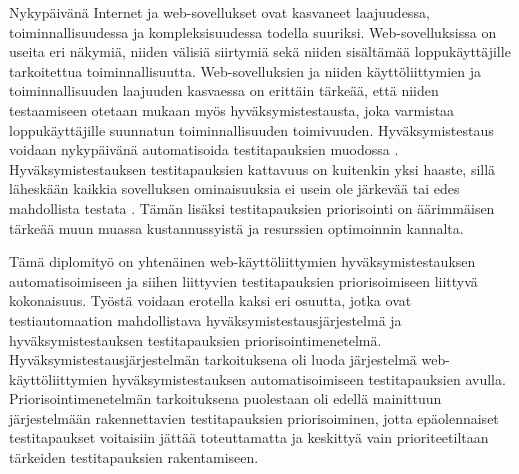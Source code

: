 Nykypäivänä Internet ja web-sovellukset ovat kasvaneet laajuudessa, toiminnallisuudessa ja komp\-lek\-si\-suu\-des\-sa todella suuriksi.
Web-sovelluksissa on useita eri näkymiä, niiden välisiä siirtymiä sekä niiden sisältämää loppukäyttäjille tarkoitettua toiminnallisuutta.
Web-sovelluksien ja niiden käyttöliittymien ja toiminnallisuuden laajuuden kasvaessa on erittäin tärkeää, että niiden testaamiseen otetaan mukaan myös hyväksymistestausta, joka varmistaa loppukäyttäjille suunnatun toiminnallisuuden toimivuuden.
Hyväksymistestaus voidaan nykypäivänä automatisoida testitapauksien muodossa \cite{robot_framework_book}.
Hyväksymistestauksen testitapauksien kattavuus on kuitenkin yksi haaste, sillä läheskään kaikkia sovelluksen ominaisuuksia ei usein ole järkevää tai edes mahdollista testata \cite[s.~24]{software_testing_book}.
Tämän lisäksi testitapauksien priorisointi on äärimmäisen tärkeää muun muassa kustannussyistä ja resurssien optimoinnin kannalta.

Tämä diplomityö on yhtenäinen web-käyttöliittymien hyväksymistestauksen automatisoimiseen ja siihen liittyvien testitapauksien priorisoimiseen liittyvä kokonaisuus.
Työstä voidaan erotella kaksi eri osuutta, jotka ovat testiautomaation mahdollistava hyväksymistestausjärjestelmä ja hyväksymistestauksen testitapauksien priorisointimenetelmä.
Hyväksymistestausjärjestelmän tarkoituksena oli luoda järjestelmä web-käyttöliittymien hyväksymistestauksen automatisoimiseen testitapauksien avulla.
Priorisointimenetelmän tarkoituksena puolestaan oli edellä mainittuun järjestelmään rakennettavien testitapauksien priorisoiminen, jotta epäolennaiset testitapaukset voitaisiin jättää toteuttamatta ja keskittyä vain prioriteetiltaan tärkeiden testitapauksien rakentamiseen.

